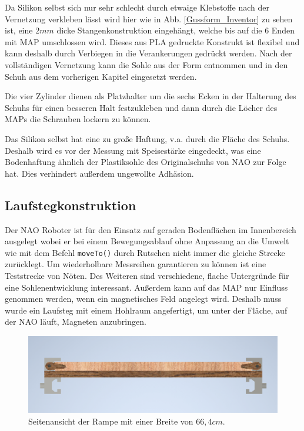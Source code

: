 Da Silikon selbst sich nur sehr schlecht durch etwaige Klebstoffe nach der Vernetzung verkleben lässt wird hier wie in Abb. \ref{Gussform_Inventor} zu sehen ist, eine $2\unit{mm}$ dicke Stangenkonstruktion eingehängt, welche bis auf die 6 Enden mit MAP umschlossen wird. Dieses aus PLA gedruckte Konstrukt ist flexibel und kann deshalb durch Verbiegen in die Verankerungen gedrückt werden. Nach der vollständigen Vernetzung kann die Sohle aus der Form entnommen und in den Schuh aus dem vorherigen Kapitel eingesetzt werden. 

Die vier Zylinder dienen als Platzhalter um die sechs Ecken in der Halterung des Schuhs für einen besseren Halt festzukleben und dann durch die Löcher des MAPs die Schrauben lockern zu können. 

Das Silikon selbst hat eine zu große Haftung, v.a. durch die Fläche des Schuhs. Deshalb wird es vor der Messung mit Speisestärke eingedeckt, was eine Bodenhaftung ähnlich der Plastiksohle des Originalschuhs von NAO zur Folge hat. Dies verhindert außerdem ungewollte Adhäsion.

\subsection{Laufstegkonstruktion} \FloatBarrier
Der NAO Roboter ist für den Einsatz auf geraden Bodenflächen im Innenbereich ausgelegt wobei er bei einem Bewegungsablauf ohne Anpassung an die Umwelt wie mit dem Befehl \texttt{moveTo()} durch Rutschen nicht immer die gleiche Strecke zurücklegt. 
Um wiederholbare Messreihen garantieren zu können ist eine Teststrecke von Nöten. Des Weiteren sind verschiedene, flache Untergründe für eine Sohlenentwicklung interessant.
Außerdem kann auf das MAP nur Einfluss genommen werden, wenn ein magnetisches Feld angelegt wird. Deshalb muss wurde ein Laufsteg mit einem Hohlraum angefertigt, um unter der Fläche, auf der NAO läuft, Magneten anzubringen. 

\begin{figure}
	\vspace{-0.5cm}
	\centering
	\includegraphics[width=\linewidth]{Bilder/Rampe_Seitenansicht3.png}
	\caption{Seitenansicht der Rampe mit einer Breite von $66,4 \unit{cm}$.}
	\label{Rampe_Seite_Inventor}
	\vspace{-0.5cm}
\end{figure}

